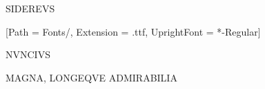 \documentclass{article}
\begin{document}
\begin{center}

{\fontsize{50}{50}\selectfont S\hspace{10mm}I\hspace{10mm}D\hspace{10mm}E\hspace{10mm}R\hspace{10mm}E\hspace{10mm}V\hspace{10mm}S}

\setmainfont{EBGaramond}[Path = Fonts/, 
                         Extension = .ttf,
                         UprightFont = *-Regular]


\vspace{3mm}
{\fontsize{34}{34}\selectfont N\hspace{5mm}V\hspace{5mm}N\hspace{5mm}C\hspace{5mm}I\hspace{5mm}V\hspace{5mm}S}


\vspace{3mm}
{\fontsize{21}{21}\selectfont M\hspace{1mm}A\hspace{1mm}G\hspace{1mm}N\hspace{1mm}A\hspace{1mm}, \hspace{1mm}L\hspace{1mm}O\hspace{1mm}N\hspace{1mm}G\hspace{1mm}E\hspace{1mm}Q\hspace{1mm}V\hspace{1mm}E \hspace{1mm}A\hspace{1mm}D\hspace{1mm}M\hspace{1mm}I\hspace{1mm}R\hspace{1mm}A\hspace{1mm}B\hspace{1mm}I\hspace{1mm}L\hspace{1mm}I\hspace{1mm}A}




\end{center}
\end{document}
